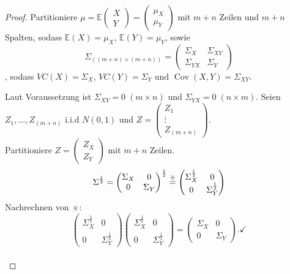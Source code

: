 \documentclass{tstextbook}
\begin{document}
\begin{proof}
	
	Partitioniere $ \mu = \mathbb{E} \begin{pmatrix} X \\ Y \end{pmatrix} =  \begin{pmatrix} \mu_X \\ \mu_Y \end{pmatrix}$ mit $ m+n $ Zeilen und $ m+n $ Spalten, sodass
	$  \mathbb{E}(X)=\mu_X $,
	$ \mathbb{E}(Y) = \mu_Y $, sowie
	\[ \Sigma_{((m+n)\times (m+n))} = \begin{pmatrix}
			\Sigma_X & \Sigma_{XY} \\ \Sigma_{YX} & \Sigma_Y
		\end{pmatrix} \], sodass 
	$ VC(X)=\Sigma_X $, $VC(Y)=\Sigma_Y $ und $ \operatorname{Cov}(X,Y) = \Sigma_{XY}. $
	
	Laut Voraussetzung ist $ \Sigma_{XY} = 0 \; (m \times n) $  und $ \Sigma_{YX} = 0 \; (n \times m). $
	Seien $ Z_1,\ldots , Z_{(m+n)} $  i.i.d $ N(0,1) $ und $ Z= \begin{pmatrix}
		 Z_1 \\ \vdots \\ Z_{(m+n)}
	\end{pmatrix} .$ \\
	Partitioniere $ Z =  \begin{pmatrix} Z_X \\ Z_Y \end{pmatrix} $  mit $ m+n $ Zeilen.
	\[ \Sigma^{\frac{1}{2}} = \begin{pmatrix}
		\Sigma_X & 0 \\
		0 & \Sigma_Y
	\end{pmatrix}^{\frac{1}{2}} 
	\stackrel{\hexstar}{=}
	 \begin{pmatrix}
	\Sigma_X^{\frac{1}{2}} & 0 \\
	0 & \Sigma_Y^{\frac{1}{2}}
	\end{pmatrix} \]
Nachrechnen von $ \hexstar $:
	\[ \begin{pmatrix}
		\Sigma_X^{\frac{1}{2}} & 0 \\
		0 & \Sigma_Y^{\frac{1}{2}}
	\end{pmatrix}
	\begin{pmatrix}
		\Sigma_X^{\frac{1}{2}} & 0 \\
		0 & \Sigma_Y^{\frac{1}{2}}
	\end{pmatrix}
	=
	\begin{pmatrix}
		\Sigma_X & 0 \\
		0 & \Sigma_Y
	\end{pmatrix}. \checkmark \] \\


\end{proof}
\end{document}
